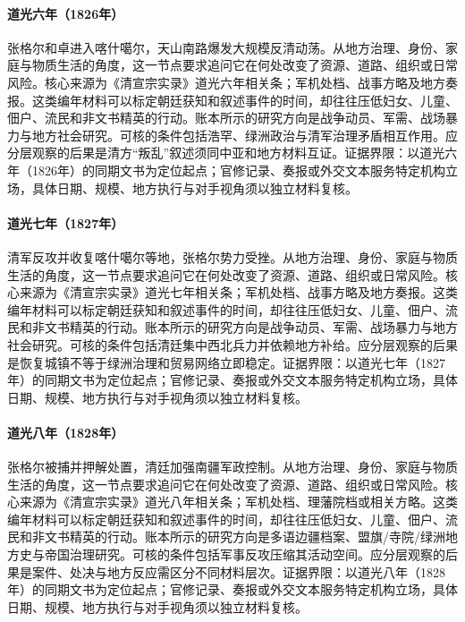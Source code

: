 \hypertarget{social:EQ-1826-JAHANGIR-KHOJA-UPRISING}{}\paragraph{道光六年（1826年）}张格尔和卓进入喀什噶尔，天山南路爆发大规模反清动荡。从地方治理、身份、家庭与物质生活的角度，这一节点要求追问它在何处改变了资源、道路、组织或日常风险。核心来源为《清宣宗实录》道光六年相关条；军机处档、战事方略及地方奏报。这类编年材料可以标定朝廷获知和叙述事件的时间，却往往压低妇女、儿童、佃户、流民和非文书精英的行动。账本所示的研究方向是战争动员、军需、战场暴力与地方社会研究。可核的条件包括浩罕、绿洲政治与清军治理矛盾相互作用。应分层观察的后果是清方“叛乱”叙述须同中亚和地方材料互证。证据界限：以道光六年（1826年）的同期文书为定位起点；官修记录、奏报或外交文本服务特定机构立场，具体日期、规模、地方执行与对手视角须以独立材料复核。
\hypertarget{social:EQ-1827-KASHGAR-RECOVERY}{}\paragraph{道光七年（1827年）}清军反攻并收复喀什噶尔等地，张格尔势力受挫。从地方治理、身份、家庭与物质生活的角度，这一节点要求追问它在何处改变了资源、道路、组织或日常风险。核心来源为《清宣宗实录》道光七年相关条；军机处档、战事方略及地方奏报。这类编年材料可以标定朝廷获知和叙述事件的时间，却往往压低妇女、儿童、佃户、流民和非文书精英的行动。账本所示的研究方向是战争动员、军需、战场暴力与地方社会研究。可核的条件包括清廷集中西北兵力并依赖地方补给。应分层观察的后果是恢复城镇不等于绿洲治理和贸易网络立即稳定。证据界限：以道光七年（1827年）的同期文书为定位起点；官修记录、奏报或外交文本服务特定机构立场，具体日期、规模、地方执行与对手视角须以独立材料复核。
\hypertarget{social:EQ-1828-JAHANGIR-CAPTURE}{}\paragraph{道光八年（1828年）}张格尔被捕并押解处置，清廷加强南疆军政控制。从地方治理、身份、家庭与物质生活的角度，这一节点要求追问它在何处改变了资源、道路、组织或日常风险。核心来源为《清宣宗实录》道光八年相关条；军机处档、理藩院档或相关方略。这类编年材料可以标定朝廷获知和叙述事件的时间，却往往压低妇女、儿童、佃户、流民和非文书精英的行动。账本所示的研究方向是多语边疆档案、盟旗/寺院/绿洲地方史与帝国治理研究。可核的条件包括军事反攻压缩其活动空间。应分层观察的后果是案件、处决与地方反应需区分不同材料层次。证据界限：以道光八年（1828年）的同期文书为定位起点；官修记录、奏报或外交文本服务特定机构立场，具体日期、规模、地方执行与对手视角须以独立材料复核。
